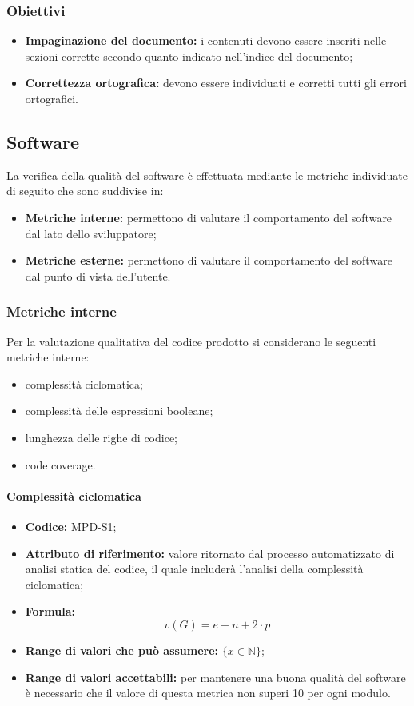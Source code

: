 \subsubsection{Obiettivi}
\begin{itemize}
    \item \textbf{Impaginazione del documento:} i contenuti devono essere inseriti nelle sezioni corrette secondo quanto indicato nell'indice del documento;
    \item \textbf{Correttezza ortografica:} devono essere individuati e corretti tutti gli errori ortografici.
\end{itemize}

\subsection{Software}
La verifica della qualità del software è effettuata mediante le metriche individuate di seguito che sono suddivise in:

\begin{itemize}
    \item \textbf{Metriche interne:} permettono di valutare il comportamento del software dal lato dello sviluppatore;
    \item \textbf{Metriche esterne:} permettono di valutare il comportamento del software dal punto di vista dell'utente.
\end{itemize}


\subsubsection{Metriche interne}
\label{_metricheQualitaCodice}
Per la valutazione qualitativa del codice prodotto si considerano le seguenti metriche interne:
\begin{itemize}
    \item complessità ciclomatica;
    \item complessità delle espressioni booleane;
    \item lunghezza delle righe di codice;
    \item code coverage.
\end{itemize}

\paragraph{Complessità ciclomatica}
\begin{itemize}
    \item \textbf{Codice:} MPD-S1;
    \item \textbf{Attributo di riferimento:} valore ritornato dal processo automatizzato di analisi statica del codice, il quale includerà l'analisi della complessità ciclomatica;
    \item \textbf{Formula:} \[ v(G)=e-n+2\cdot p \]
    \item \textbf{Range di valori che può assumere:} $\{x \in \mathbb{N} \}$;
    \item \textbf{Range di valori accettabili:} per mantenere una buona qualità del software è necessario che il valore di questa metrica non superi
    10 per ogni modulo.
\end{itemize}

